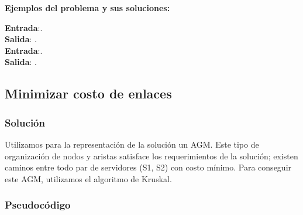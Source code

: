 \documentclass[a4paper, 10pt, twoside]{article}
\begin{document}
\textbf{Ejemplos del problema y sus soluciones:}

\textbf{Entrada}:. \\
\textbf{Salida}: . \\

\textbf{Entrada}:. \\
\textbf{Salida}: . \\

\subsection{Minimizar costo de enlaces}
\subsubsection{Solución}
Utilizamos para la representación de la solución un AGM. Este tipo de organización de nodos y aristas satisface los requerimientos de la solución; existen caminos entre todo par de servidores (S1, S2) con costo mínimo. Para conseguir este AGM, utilizamos el algoritmo de Kruskal.

\subsubsection{Pseudocódigo}
\end{document}
